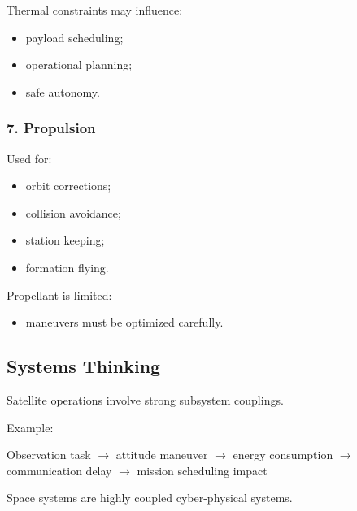 \documentclass[10pt,a4paper,twocolumn]{article}
\begin{document}
Thermal constraints may influence:
\begin{itemize}
    \item payload scheduling;
    \item operational planning;
    \item safe autonomy.
\end{itemize}


\subsubsection*{7. Propulsion}

Used for:
\begin{itemize}
    \item orbit corrections;
    \item collision avoidance;
    \item station keeping;
    \item formation flying.
\end{itemize}

Propellant is limited:
\begin{itemize}
    \item maneuvers must be optimized carefully.
\end{itemize}


\subsection{Systems Thinking}

Satellite operations involve strong subsystem couplings.

Example:
\begin{center}
    Observation task
    $\rightarrow$
    attitude maneuver
    $\rightarrow$
    energy consumption
    $\rightarrow$
    communication delay
    $\rightarrow$
    mission scheduling impact
\end{center}

\begin{keybox}
    Space systems are highly coupled cyber-physical systems.
\end{keybox}

\end{document}
